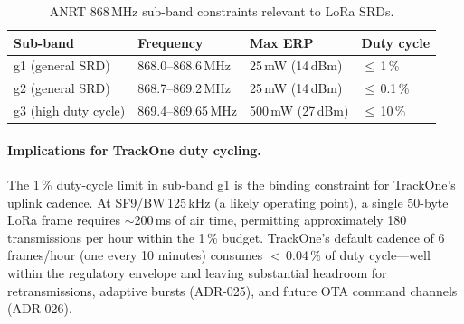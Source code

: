 \begin{table}[H]
\centering
\small
\caption{ANRT 868\,MHz sub-band constraints relevant to LoRa SRDs.}
\label{tab:anrt-868}
\begin{tabular}{@{}llll@{}}
\toprule
\textbf{Sub-band}       & \textbf{Frequency}       & \textbf{Max ERP}  & \textbf{Duty cycle} \\
\midrule
g1 (general \ac{SRD})        & 868.0--868.6\,MHz        & 25\,mW (14\,dBm)  & $\le$\,1\,\%        \\
g2 (general \ac{SRD})        & 868.7--869.2\,MHz        & 25\,mW (14\,dBm)  & $\le$\,0.1\,\%      \\
g3 (high duty cycle)    & 869.4--869.65\,MHz       & 500\,mW (27\,dBm) & $\le$\,10\,\%       \\
\bottomrule
\end{tabular}
\end{table}


\paragraph{Implications for TrackOne duty cycling.}
The 1\,\% duty-cycle limit in sub-band g1 is the binding constraint for TrackOne's
uplink cadence.
At \ac{SF}9/BW\,125\,kHz (a likely operating point), a single 50-byte \ac{LoRa} frame requires
$\sim$200\,ms of air time, permitting approximately 180 transmissions per hour within
the 1\,\% budget.
TrackOne's default cadence of 6 frames/hour (one every 10 minutes) consumes
$<$\,0.04\,\% of duty cycle---well within the regulatory envelope and leaving substantial
headroom for retransmissions, adaptive bursts (\ac{ADR}-025), and future OTA command channels
(\ac{ADR}-026).

